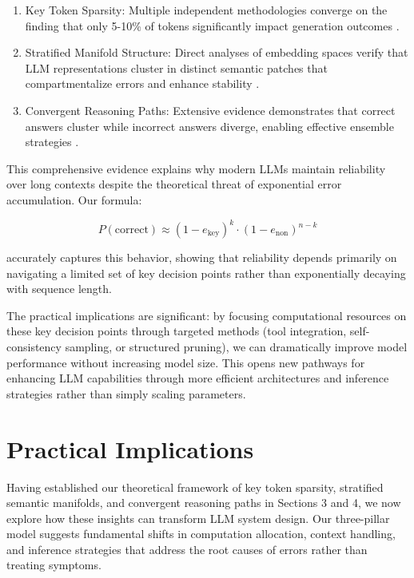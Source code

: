 \documentclass{article}
\begin{document}
\begin{enumerate}
\item Key Token Sparsity: Multiple independent methodologies converge on the finding that only 5-10\% of tokens significantly impact generation outcomes \citep{liu2023lost, pang2024anchor, fang2024what, jin2020textfooler, moshkov2025aimo}.

\item Stratified Manifold Structure: Direct analyses of embedding spaces verify that LLM representations cluster in distinct semantic patches that compartmentalize errors and enhance stability \citep{li2025unraveling, robinson2023token, viswanathan2023geometry, gao2024insights}.

\item Convergent Reasoning Paths: Extensive evidence demonstrates that correct answers cluster while incorrect answers diverge, enabling effective ensemble strategies \citep{wang2023self, yao2023tree, costello2025think}.
\end{enumerate}

This comprehensive evidence explains why modern LLMs maintain reliability over long contexts despite the theoretical threat of exponential error accumulation. Our formula:

\begin{equation}
P(\text{correct}) \approx (1-e_{\text{key}})^k \cdot (1-e_{\text{non}})^{n-k}
\end{equation}

accurately captures this behavior, showing that reliability depends primarily on navigating a limited set of key decision points rather than exponentially decaying with sequence length.

The practical implications are significant: by focusing computational resources on these key decision points through targeted methods (tool integration, self-consistency sampling, or structured pruning), we can dramatically improve model performance without increasing model size. This opens new pathways for enhancing LLM capabilities through more efficient architectures and inference strategies rather than simply scaling parameters.

\section{Practical Implications}

Having established our theoretical framework of key token sparsity, stratified semantic manifolds, and convergent reasoning paths in Sections 3 and 4, we now explore how these insights can transform LLM system design. Our three-pillar model suggests fundamental shifts in computation allocation, context handling, and inference strategies that address the root causes of errors rather than treating symptoms.
\end{document}
